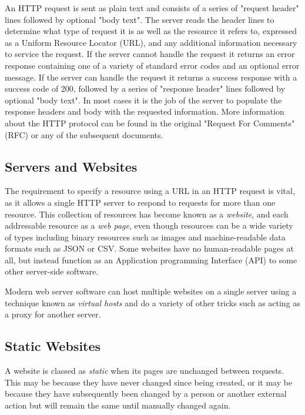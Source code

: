 An HTTP request is sent as plain text and consists of a series of "request header" lines followed by optional "body text". The server reads the header lines to determine what type of request it is as well as the resource it refers to, expressed as a Uniform Resource Locator (URL), and any additional information necessary to service the request. If the server cannot handle the request it returns an error response containing one of a variety of standard error codes and an optional error message. If the server can handle the request it returns a success response with a success code of 200, followed by a series of "response header" lines followed by optional "body text". In most cases it is the job of the server to populate the response headers and body with the requested information. More information about the HTTP protocol can be found in the original "Request For Comments" (RFC) \citep{Berners-Lee1996} or any of the subsequent documents.

\subsection{Servers and Websites}
The requirement to specify a resource using a URL in an HTTP request is vital, as it allows a single HTTP server to respond to requests for more than one resource. This collection of resources has become known as a \emph{website}, and each addressable resource as a \emph{web page}, even though resources can be a wide variety of types including binary resources such as images and machine-readable data formats such as JSON or CSV. Some websites have no human-readable pages at all, but instead function as an Application programming Interface (API) to some other server-side software.

Modern web server software can host multiple websites on a single server using a technique known as \emph{virtual hosts} and do a variety of other tricks such as acting as a proxy for another server. 

\subsection{Static Websites}
A website is classed as \emph{static} when its pages are unchanged between requests. This may be because they have never changed since being created, or it may be because they have subsequently been changed by a person or another external action but will remain the same until manually changed again.

